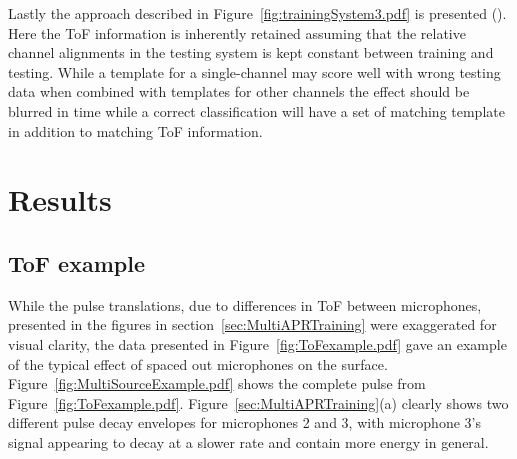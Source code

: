 Lastly the approach described in Figure~\ref{fig:trainingSystem3.pdf} is presented (). Here the ToF information is inherently retained assuming that the relative channel alignments in the testing system is kept constant between training and testing. While a template for a single-channel may score well with wrong testing data when combined with templates for other channels the effect should be blurred in time while a correct classification will have a set of matching template in addition to matching ToF information.

\section{Results}\label{sec:MultiAPRResults}
\subsection{ToF example}
While the pulse translations, due to differences in ToF between microphones, presented in the figures in section~\ref{sec:MultiAPRTraining} were exaggerated for visual clarity, the data presented in Figure~\ref{fig:ToFexample.pdf} gave an example of the typical effect of spaced out microphones on the surface. Figure~\ref{fig:MultiSourceExample.pdf} shows the complete pulse from Figure~\ref{fig:ToFexample.pdf}. Figure~\ref{sec:MultiAPRTraining}(a) clearly shows two different pulse decay envelopes for microphones 2 and 3, with microphone 3's signal appearing to decay at a slower rate and contain more energy in general.


